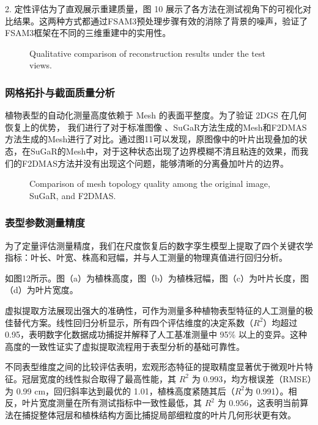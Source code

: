 \documentclass[preprint,12pt]{elsarticle}
\begin{document}
2. 定性评估为了直观展示重建质量，图 10 展示了各方法在测试视角下的可视化对比结果。这两种方式都通过FSAM3预处理步骤有效的消除了背景的噪声，验证了FSAM3框架在不同的三维重建中的实用性。

\begin{figure}[t]
\centering
\caption{Qualitative comparison of reconstruction results under the test views.}
\label{fig:image19}
\end{figure}

\subsubsection{网格拓扑与截面质量分析}

植物表型的自动化测量高度依赖于 Mesh 的表面平整度。为了验证 2DGS 在几何恢复上的优势， 我们进行了对于标准图像 、SuGaR方法生成的Mesh和F2DMAS方法生成的Mesh进行了对比。通过图11可以发现，原图像中的叶片出现叠加的状态，在SuGaR的Mesh中，对于这种状态出现了边界模糊不清且粘连的效果，而我们的F2DMAS方法并没有出现这个问题，能够清晰的分离叠加叶片的边界。

\begin{figure}[t]
\centering
\caption{Comparison of mesh topology quality among the original image, SuGaR, and F2DMAS.}
\label{fig:image21}
\end{figure}

\subsubsection{表型参数测量精度}

为了定量评估测量精度，我们在尺度恢复后的数字孪生模型上提取了四个关键农学指标：叶长、叶宽、株高和冠幅，并与人工测量的物理真值进行回归分析。

如图12所示。图（a）为植株高度，图（b）为植株冠幅，图（c）为叶片长度，图（d）为叶片宽度。

虚拟提取方法展现出强大的准确性，可作为测量多种植物表型特征的人工测量的极佳替代方案。线性回归分析显示，所有四个评估维度的决定系数（${R}^{2}$）均超过 0.95，表明数字化数据成功捕捉并解释了人工基准测量中 95\% 以上的变异。这种高度的一致性证实了虚拟提取流程用于表型分析的基础可靠性。

不同表型维度之间的比较评估表明，宏观形态特征的提取精度显著优于微观叶片特征。冠层宽度的线性拟合取得了最高性能，其 ${R}^{2}$ 为 0.993，均方根误差（RMSE）为 0.99 cm，回归斜率达到最优的 1.01，植株高度紧随其后（${R}^{2}$为 0.991）。相反，叶片宽度测量在所有测试指标中一致性最低，其 ${R}^{2}$ 为 0.956，这表明当前算法在捕捉整体冠层和植株结构方面比捕捉局部细粒度的叶片几何形状更有效。
\end{document}
